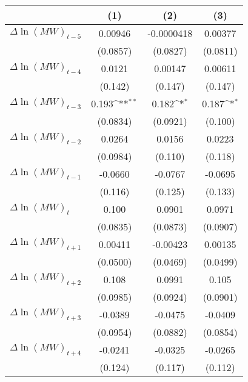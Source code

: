 {
\def\sym#1{\ifmmode^{#1}\else\(^{#1}\)\fi}
\begin{tabular}{l*{3}{c}}
\hline\hline
          &\multicolumn{1}{c}{(1)}         &\multicolumn{1}{c}{(2)}         &\multicolumn{1}{c}{(3)}         \\
\hline
$\Delta \ln(MW)_{t-5}$&  0.00946         &-0.0000418         &  0.00377         \\
          & (0.0857)         & (0.0827)         & (0.0811)         \\
[1em]
$\Delta \ln(MW)_{t-4}$&   0.0121         &  0.00147         &  0.00611         \\
          &  (0.142)         &  (0.147)         &  (0.147)         \\
[1em]
$\Delta \ln(MW)_{t-3}$&    0.193\sym{**} &    0.182\sym{*}  &    0.187\sym{*}  \\
          & (0.0834)         & (0.0921)         &  (0.100)         \\
[1em]
$\Delta \ln(MW)_{t-2}$&   0.0264         &   0.0156         &   0.0223         \\
          & (0.0984)         &  (0.110)         &  (0.118)         \\
[1em]
$\Delta \ln(MW)_{t-1}$&  -0.0660         &  -0.0767         &  -0.0695         \\
          &  (0.116)         &  (0.125)         &  (0.133)         \\
[1em]
$\Delta \ln(MW)_{t}$&    0.100         &   0.0901         &   0.0971         \\
          & (0.0835)         & (0.0873)         & (0.0907)         \\
[1em]
$\Delta \ln(MW)_{t+1}$&  0.00411         & -0.00423         &  0.00135         \\
          & (0.0500)         & (0.0469)         & (0.0499)         \\
[1em]
$\Delta \ln(MW)_{t+2}$&    0.108         &   0.0991         &    0.105         \\
          & (0.0985)         & (0.0924)         & (0.0901)         \\
[1em]
$\Delta \ln(MW)_{t+3}$&  -0.0389         &  -0.0475         &  -0.0409         \\
          & (0.0954)         & (0.0882)         & (0.0854)         \\
[1em]
$\Delta \ln(MW)_{t+4}$&  -0.0241         &  -0.0325         &  -0.0265         \\
          &  (0.124)         &  (0.117)         &  (0.112)         \\

\end{tabular}}
